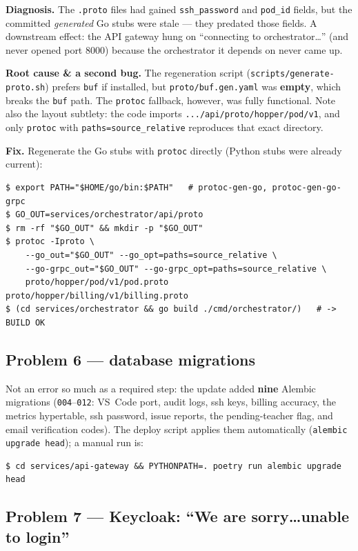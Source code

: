 \documentclass[11pt,a4paper]{article}
\newcommand{\code}[1]{\texttt{\small #1}}
\begin{document}
\textbf{Diagnosis.} The \code{.proto} files had gained \code{ssh\_password} and
\code{pod\_id} fields, but the committed \emph{generated} Go stubs were stale ---
they predated those fields. A downstream effect: the API gateway hung on
``connecting to orchestrator\dots'' (and never opened port 8000) because the
orchestrator it depends on never came up.

\textbf{Root cause \& a second bug.} The regeneration script
(\code{scripts/generate-proto.sh}) prefers \code{buf} if installed, but
\code{proto/buf.gen.yaml} was \textbf{empty}, which breaks the \code{buf} path.
The \code{protoc} fallback, however, was fully functional. Note also the layout
subtlety: the code imports
\code{.../api/proto/hopper/pod/v1}, and only \code{protoc} with
\code{paths=source\_relative} reproduces that exact directory.

\textbf{Fix.} Regenerate the Go stubs with \code{protoc} directly (Python stubs
were already current):
\begin{lstlisting}
$ export PATH="$HOME/go/bin:$PATH"   # protoc-gen-go, protoc-gen-go-grpc
$ GO_OUT=services/orchestrator/api/proto
$ rm -rf "$GO_OUT" && mkdir -p "$GO_OUT"
$ protoc -Iproto \
    --go_out="$GO_OUT" --go_opt=paths=source_relative \
    --go-grpc_out="$GO_OUT" --go-grpc_opt=paths=source_relative \
    proto/hopper/pod/v1/pod.proto proto/hopper/billing/v1/billing.proto
$ (cd services/orchestrator && go build ./cmd/orchestrator/)   # -> BUILD OK
\end{lstlisting}

\subsection{Problem 6 --- database migrations}

Not an error so much as a required step: the update added \textbf{nine} Alembic
migrations (\code{004}--\code{012}: VS~Code port, audit logs, ssh keys, billing
accuracy, the metrics hypertable, ssh password, issue reports, the
pending-teacher flag, and email verification codes). The deploy script applies
them automatically (\code{alembic upgrade head}); a manual run is:
\begin{lstlisting}
$ cd services/api-gateway && PYTHONPATH=. poetry run alembic upgrade head
\end{lstlisting}

\subsection{Problem 7 --- Keycloak: ``We are sorry\dots unable to login''}
\end{document}
